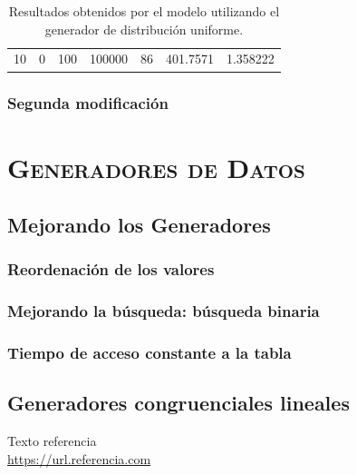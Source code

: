 \documentclass[11pt,a4paper]{report}
\begin{document}
\begin{table}[H]
{\begin{tabular}{c|c|c|c|c|c|c}
10                                                                                   & 0                                                                                      & 100                                                                        & 100000                                                                    & 86                                                                                        & 401.7571                                                                  & 1.358222             
\end{tabular}%
}
\caption{Resultados obtenidos por el modelo utilizando el generador de distribución uniforme.}
\label{tabla4}
\end{table}

\subsection{Segunda modificación}

\newpage

\chapter{\textsc{Generadores de Datos}}

\section{Mejorando los Generadores}

\subsection{Reordenación de los valores}

\subsection{Mejorando la búsqueda: búsqueda binaria}

\subsection{Tiempo de acceso constante a la tabla}

\section{Generadores congruenciales lineales}

\newpage

\begin{thebibliography}{5}

Texto referencia
\\\url{https://url.referencia.com}

\end{thebibliography}
\end{document}
